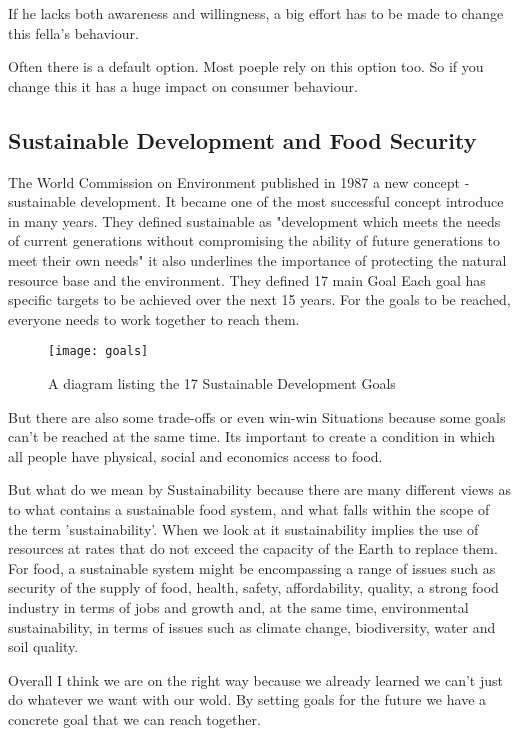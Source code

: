 If he lacks both awareness and willingness, a big effort has to be made to change this fella's
behaviour.

Often there is a default option. Most poeple rely on this option too. So if you change this it
has a huge impact on consumer behaviour.

\newpage

\subsection{Sustainable Development
	and Food Security}
The World Commission on Environment published in 1987 a new concept - sustainable development. It became one of the most successful concept introduce in many years. They defined sustainable as "development which meets the needs of current generations without compromising the ability of future generations to meet their own needs" \cite{_our}it also underlines the importance of protecting the natural resource base and the environment. They defined 17 main Goal Each goal has specific targets to be achieved over the next 15 years. For the goals to be reached, everyone needs to work together to reach them.

\begin{figure}[H]	
	\centering
	\texttt{[image: goals]}
	\caption{A diagram listing the 17 Sustainable Development Goals}
	\label{fig:ha}
\end{figure}

But there are also some trade-offs or even win-win Situations because some goals can’t be reached at the same time.
Its important to create a condition in which all people have physical, social and economics access to food.

But what do we mean by Sustainability because there are many different views as to what contains a sustainable food system, and what falls within the scope of the term 'sustainability’. When we look at it sustainability implies the use of resources at rates that do not exceed the capacity of the Earth to replace them. For food, a sustainable system might be encompassing a range of issues such as security of the supply of food, health, safety, affordability, quality, a strong food industry in terms of jobs and growth and, at the same time, environmental sustainability, in terms of issues such as climate change, biodiversity, water and soil quality.

Overall I think we are on the right way because we already learned we can’t just do whatever we want with our wold. By setting goals for the future we have a concrete goal that we can reach together.
